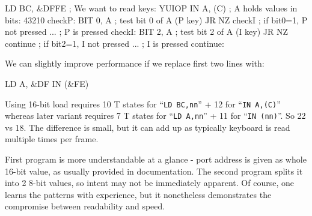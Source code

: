 \begin{tcblisting}{}
	LD BC, &DFFE   ; We want to read keys:   YUIOP
	IN A, (C)      ; A holds values in bits: 43210
checkP:
	BIT 0, A       ; test bit 0 of A (P key)
	JR NZ checkI   ; if bit0=1, P not pressed
	...            ; P is pressed
checkI:
	BIT 2, A       ; test bit 2 of A (I key)
	JR NZ continue ; if bit2=1, I not pressed
	...            ; I is pressed
continue:
\end{tcblisting}

We can slightly improve performance if we replace first two lines with:

\begin{tcblisting}{}
	LD A, &DF
	IN (&FE)
\end{tcblisting}

Using 16-bit load requires 10 T states for ``{\tt LD BC,nn}'' + 12 for ``{\tt IN A,(C)}'' whereas later variant requires 7 T states for ``{\tt LD A,nn}'' + 11 for ``{\tt IN (nn)}''. So 22 vs 18. The difference is small, but it can add up as typically keyboard is read multiple times per frame.

First program is more understandable at a glance - port address is given as whole 16-bit value, as usually provided in documentation. The second program splits it into 2 8-bit values, so intent may not be immediately apparent. Of course, one learns the patterns with experience, but it nonetheless demonstrates the compromise between readability and speed.



\pagebreak